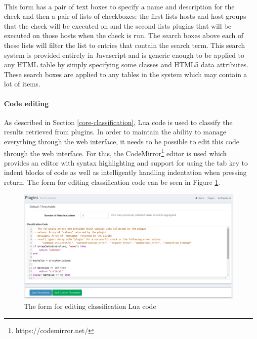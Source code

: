 \documentclass[bsc,logo,twoside,singlespacing]{infthesis}
\begin{document}
\paragraph*{}
	This form has a pair of text boxes to specify a name and description for the
	check and then a pair of lists of checkboxes: the first lists hosts and host
	groups that the check will be executed on and the second lists plugins that
	will be executed on those hosts when the check is run.  The search boxes above
	each of these lists will filter the list to entries that contain the search
	term. This search system is provided entirely in Javascript and is generic
	enough to be applied to any HTML table by simply specifying some classes and
	HTML5 data attributes.  These search boxes are applied to any tables in the
	system which may contain a lot of items.
	
\paragraph*{Code editing}
	As described in Section \ref{core-classification}, Lua code is used to classify
	the results retrieved from plugins.  In order to maintain the ability to manage
	everything through the web interface, it needs to be possible to edit this code
	through the web interface.  For this, the
	CodeMirror\footnote{https://codemirror.net/} editor is used which provides an
	editor with syntax highlighting and support for using the tab key to indent
	blocks of code as well as intelligently handling indentation when pressing
	return.  The form for editing classification code can be seen in Figure
	\ref{set-thresholds}.

\begin{figure}[H]
	\caption{The form for editing classification Lua code}
	\label{set-thresholds}
	\includegraphics[scale=0.45]{assets/screenshots/set-thresholds.pdf}
\end{figure}
\end{document}
